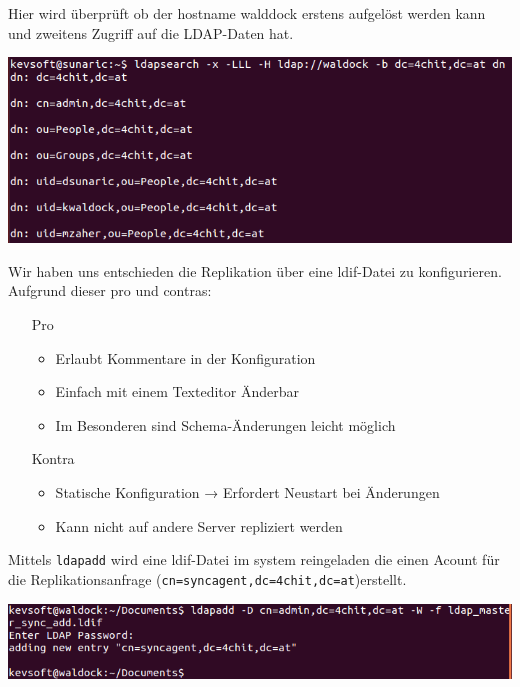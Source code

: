 Hier wird überprüft ob der hostname walddock erstens aufgelöst werden kann und zweitens Zugriff auf die LDAP-Daten hat.


\begin{center}
	\includegraphics[width=1.0\linewidth]{images/a6_testaccessfromslavetomaster.PNG}
\end{center}

Wir haben uns entschieden die Replikation über eine ldif-Datei zu konfigurieren.\\Aufgrund dieser pro und contras:
\begin{itemize}
	\item[Pro   ] 
	\begin{itemize}
		\item Erlaubt Kommentare in der Konfiguration
		\item Einfach mit einem Texteditor Änderbar
		\item Im Besonderen sind Schema-Änderungen 
		leicht möglich
	\end{itemize}
	\item[Kontra]
		\begin{itemize}
			\item Statische Konfiguration → Erfordert Neustart 
			bei Änderungen
			\item Kann nicht auf andere Server repliziert werden
		\end{itemize}
\end{itemize}
Mittels \verb|ldapadd| wird eine ldif-Datei im system reingeladen die einen Acount für die Replikationsanfrage (\verb|cn=syncagent,dc=4chit,dc=at|)erstellt.

\begin{center}
	\includegraphics[width=1.0\linewidth]{images/a7_add_sync_account.PNG}
\end{center}


